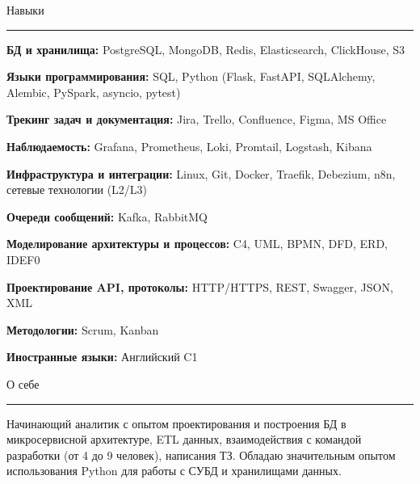 \documentclass[14pt, a4paper, oneside]{extarticle}
\begin{document}

\begin{flushleft}
	\vspace{-\intextsep}
	\large Навыки
\end{flushleft}

\vspace{-0.8\intextsep}
\hrule


\vspace{0.5\intextsep}

\textbf{БД и хранилища:} PostgreSQL, MongoDB, Redis, Elasticsearch, ClickHouse, S3

\textbf{Языки программирования:} SQL, Python (Flask, FastAPI, SQLAlchemy, Alembic, PySpark, asyncio, pytest)

\textbf{Трекинг задач и документация:} Jira, Trello, Confluence, Figma, MS Office

\textbf{Наблюдаемость:} Grafana, Prometheus, Loki, Promtail, Logstash, Kibana

\textbf{Инфраструктура и интеграции:} Linux, Git, Docker, Traefik, Debezium, n8n, сетевые технологии (L2/L3)

\textbf{Очереди сообщений:} Kafka, RabbitMQ

\textbf{Моделирование архитектуры и процессов:} C4, UML, BPMN, DFD, ERD, IDEF0

\textbf{Проектирование API, протоколы:} HTTP/HTTPS, REST, Swagger, JSON, XML

\textbf{Методологии:} Scrum, Kanban 

\textbf{Иностранные языки:} Английский C1


\begin{flushleft}
	\vspace{-\intextsep}
	\large О себе
\end{flushleft}

\vspace{-0.8\intextsep}
\hrule

\begin{sloppypar}
	\vspace{0.5\intextsep}
	\quad
	Начинающий аналитик с опытом проектирования и построения БД в микросервисной архитектуре, ETL данных, взаимодействия с командой разработки (от 4 до 9 человек), написания ТЗ. Обладаю значительным опытом использования Python для работы с СУБД и хранилищами данных. 
\end{sloppypar}
\end{document}
